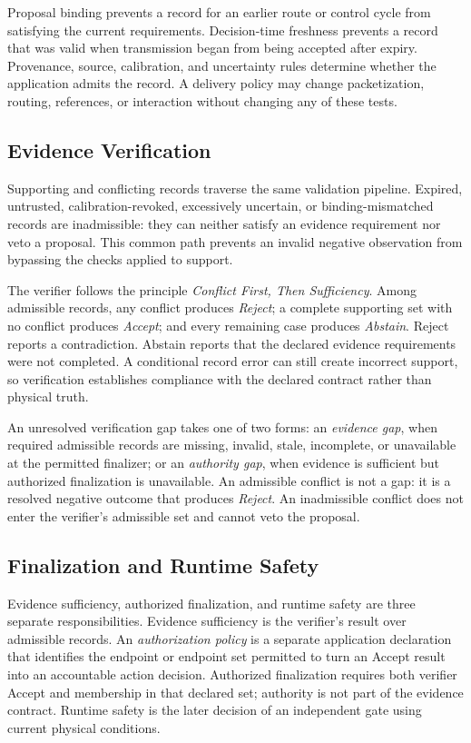 Proposal binding prevents a record for an earlier route or control cycle from
satisfying the current requirements. Decision-time freshness prevents a record
that was valid when transmission began from being accepted after expiry.
Provenance, source, calibration, and uncertainty rules determine whether the
application admits the record. A delivery policy may change packetization,
routing, references, or interaction without changing any of these tests.

\subsection{Evidence Verification}

Supporting and conflicting records traverse the same validation pipeline.
Expired, untrusted, calibration-revoked, excessively uncertain, or
binding-mismatched records are inadmissible: they can neither satisfy an
evidence requirement nor veto a proposal. This common path prevents an invalid
negative observation from bypassing the checks applied to support.

The verifier follows the principle \emph{Conflict First, Then Sufficiency}.
Among admissible records, any conflict produces \emph{Reject}; a complete
supporting set with no conflict produces \emph{Accept}; and every remaining
case produces \emph{Abstain}. Reject reports a contradiction. Abstain reports
that the declared evidence requirements were not completed. A conditional
record error can still create incorrect support, so verification establishes
compliance with the declared contract rather than physical truth.

An unresolved verification gap takes one of two forms: an \emph{evidence gap},
when required admissible records are missing, invalid, stale, incomplete, or
unavailable at the permitted finalizer; or an \emph{authority gap}, when
evidence is sufficient but authorized finalization is unavailable. An
admissible conflict is not a gap: it is a resolved negative outcome that
produces \emph{Reject}. An inadmissible conflict does not enter the verifier's
admissible set and cannot veto the proposal.

\subsection{Finalization and Runtime Safety}

Evidence sufficiency, authorized finalization, and runtime safety are three
separate responsibilities. Evidence sufficiency is the verifier's result over
admissible records. An \emph{authorization policy} is a separate application
declaration that identifies the endpoint or endpoint set permitted to turn an
Accept result into an accountable action decision. Authorized finalization
requires both verifier Accept and membership in that declared set; authority is
not part of the evidence contract. Runtime safety is the later decision of an
independent gate using current physical conditions.

